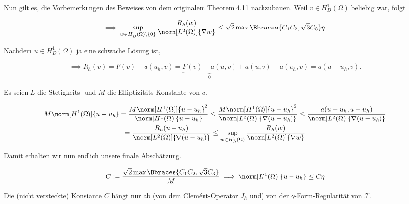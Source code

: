 \begin{solution}
\begin{enumerate}[label = \textbf{\alph*)}]
  Nun gilt es, die Vorbemerkungen des Beweises von dem originalem Theorem 4.11 nachzubauen.
  Weil $v \in H_D^1(\Omega)$ beliebig war, folgt

  \begin{align*}
    \implies
    \sup_{w \in H_D^1(\Omega) \setminus \{0\}}
    \frac
    {
      R_h(w)
    }{
      \norm[L^2(\Omega)]{\nabla w}
    }
    \leq
    \sqrt{2}
    \max \Bbraces{C_1 C_2, \sqrt{3} C_3}
    \eta.
  \end{align*}

  Nachdem $u \in H_D^1(\Omega)$ ja eine schwache Lösung ist,

  \begin{align*}
    \implies
    R_h(v)
    =
    F(v) - a(u_h, v)
    =
    \underbrace
    {
      F(v) - a(u, v)
    }_0
    +
    a(u, v)
    -
    a(u_h, v)
    =
    a(u - u_h, v).
  \end{align*}

  Es seien $L$ die Stetigkeits- und $M$ die Elliptizitäts-Konstante von $a$.

  \begin{multline*}
    M \norm[H^1(\Omega)]{u - u_h}
    =
    \frac
    {
      M \norm[H^1(\Omega)]{u - u_h}^2
    }{
      \norm[H^1(\Omega)]{u - u_h}
    }
    \leq
    \frac
    {
      M \norm[H^1(\Omega)]{u - u_h}^2
    }{
      \norm[L^2(\Omega)]{\nabla (u - u_h)}
    }
    \leq
    \frac
    {
      a(u - u_h, u - u_h)
    }{
      \norm[L^2(\Omega)]{\nabla (u - u_h)}
    } \\
    =
    \frac
    {
      R_h(u - u_h)
    }{
      \norm[L^2(\Omega)]{\nabla (u - u_h)}
    }
    \leq
    \sup_{w \in H_D^1(\Omega)}
    \frac
    {
      R_h(w)
    }{
      \norm[L^2(\Omega)]{\nabla w}
    }
  \end{multline*}

  Damit erhalten wir nun endlich unsere finale Abschätzung.

  \begin{align*}
    C
    :=
    \frac
    {
      \sqrt{2}
      \max \Bbraces{C_1 C_2, \sqrt{3} C_3}
    }{
      M
    }
    \implies
    \norm[H^1(\Omega)]{u - u_h}
    \leq
    C \eta
  \end{align*}

  Die (nicht versteckte) Konstante $C$ hängt nur ab (von dem Clemént-Operator $J_h$ und) von der $\gamma$-Form-Regularität von $\mathcal{T}$.

\end{enumerate}

\end{solution}

